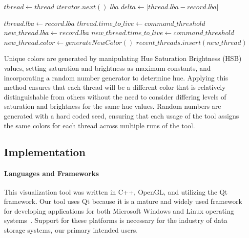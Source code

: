 \documentclass[journal]{vgtc}                %
\begin{document}
\begin{algorithmic}
      \STATE{}
      \STATE $thread \gets thread\_iterator.next()$
      \STATE $lba\_delta\gets |thread.lba - record.lba|$
    \ENDWHILE


     \STATE{}
        \STATE $thread.lba \gets record.lba$
        \STATE $thread.time\_to\_live \gets command\_threshold$
    \ELSE \STATE{}
      \STATE $new\_thread.lba \gets record.lba$
      \STATE $new\_thread.time\_to\_live \gets command\_threshold$
      \STATE $new\_thread.color \gets generateNewColor()$
      \STATE $recent\_threads.insert(new\_thread) $
    \ENDIF


\ENDFOR
\end{algorithmic}

Unique colors are generated by manipulating Hue Saturation Brightness (HSB) values, setting saturation and brightness as maximum constants, and incorporating a random number generator to determine hue. Applying this method ensures that each thread will be a different color that is relatively distinguishable from others without the need to consider differing levels of saturation and brightness for the same hue values. Random numbers are generated with a hard coded seed, ensuring that each usage of the tool assigns the same colors for each thread across multiple runs of the tool.

\subsection{Implementation}

\paragraph{Languages and Frameworks}
This visualization tool was written in C++, OpenGL, and utilizing the Qt framework. Our tool uses Qt because it is a mature and widely used framework for developing applications for both Microsoft Windows and Linux operating systems~\cite{qt:nokia}. Support for these platforms is necessary for the industry of data storage systems, our primary intended users.
\end{document}
